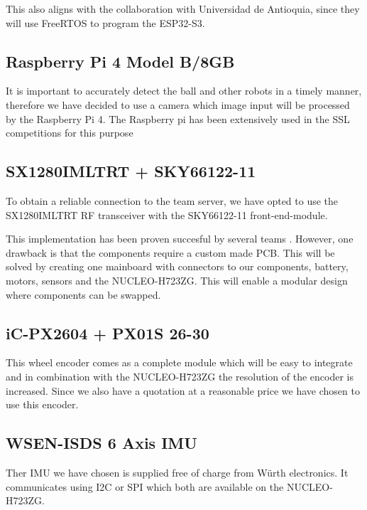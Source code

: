 \documentclass[a4paper,12pt]{article}
\begin{document}
  This also aligns with the collaboration with Universidad de Antioquia,
  since they will use FreeRTOS to program the ESP32-S3.

  \subsection*{Raspberry Pi 4 Model B/8GB}

  It is important to accurately detect the ball and other robots in a
  timely manner, therefore we have decided to use a camera which image
  input will be processed by the Raspberry Pi 4. The Raspberry pi has
  been extensively used in the SSL competitions for this purpose
  \cite{ommerExtendedTeamDescription}\cite{satoGreenTea2024Team}

  \subsection*{SX1280IMLTRT + SKY66122-11}

  To obtain a reliable connection to the team server, we have opted to
  use the SX1280IMLTRT RF transceiver with the SKY66122-11
  front-end-module.

  This implementation has been proven succesful by several teams \cite{ryllExtendedTeamDescription}\cite{barretoRoboIMEIgnitingInnovation}.
  However, one drawback is that the components require a custom made
  PCB. This will be solved by creating one mainboard with connectors to
  our components, battery, motors, sensors and the NUCLEO-H723ZG. This
  will enable a modular design where components can be swapped.

  \subsection*{iC-PX2604 + PX01S 26-30}

  This wheel encoder comes as a complete module which will be easy to
  integrate and in combination with the NUCLEO-H723ZG the resolution of
  the encoder is increased. Since we also have a quotation at a
  reasonable price we have chosen to use this encoder.

  \subsection*{WSEN-ISDS 6 Axis IMU}

  Ther IMU we have chosen is supplied free of charge from Würth
  electronics. It communicates using I2C or SPI which both are available
  on the NUCLEO-H723ZG.
\end{document}
